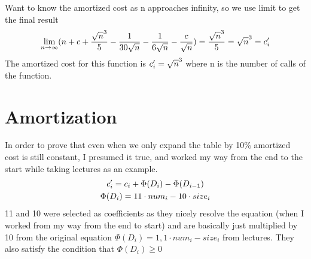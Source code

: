 \documentclass[12pt]{article}
\begin{document}
	Want to know the amortized cost as n approaches infinity, so we use limit to get the final result
	\begin{gather*}
		\lim_{n\to\infty}(n + c + \frac{\sqrt{n}^{3}}{5} - \frac{1}{30\sqrt{n}} - \frac{1}{6\sqrt{n}} - \frac{c}{\sqrt{n}}) = \frac{\sqrt{n}^{3}}{5} = \sqrt{n}^{3} = c_i\sp{\prime}
	\end{gather*}
	The amortized cost for this function is $c_i\sp{\prime} = \sqrt{n}^{3}$ where n is the number of calls of the function.

\section{Amortization}
	In order to prove that even when we only expand the table by 10\% amortized cost is still constant, I presumed it true, and worked my way from the end to the start while taking lectures as an example.
	\begin{gather*}
		c_i\sp{\prime} = c_i + \Phi(D_i) - \Phi(D_{i-1})\\
		\Phi(D_i) = 11 \cdot num_i - 10 \cdot size_i
	\end{gather*}
	11 and 10 were selected as coefficients as they nicely resolve the equation (when I worked from my way from the end to start) and are basically just multiplied by 10 from the original equation $\Phi(D_i) = 1,1 \cdot num_i - size_i$ from lectures. They also satisfy the condition that $\Phi(D_i) \geq 0$
\end{document}
